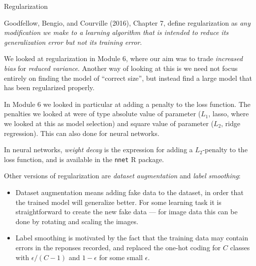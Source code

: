 \documentclass[10pt,ignorenonframetext,]{beamer}
\begin{document}
\begin{frame}[fragile]

\begin{block}{Regularization}

Goodfellow, Bengio, and Courville (2016), Chapter 7, define
regularization as \emph{any modification we make to a learning algorithm
that is intended to reduce its generalization error but not its training
error}.

We looked at regularization in Module 6, where our aim was to trade
\emph{increased bias} for \emph{reduced variance}. Another way of
looking at this is we need not focus entirely on finding the model of
``correct size'', but instead find a large model that has been
regularized properly.

In Module 6 we looked in particular at adding a penalty to the loss
function. The penalties we looked at were of type absolute value of
parameter (\(L_1\), lasso, where we looked at this as model selection)
and square value of parameter (\(L_2\), ridge regression). This can also
done for neural networks.

In neural networks, \emph{weight decay} is the expression for adding a
\(L_2\)-penalty to the loss function, and is available in the
\texttt{nnet} R package.

\end{block}

\end{frame}

\begin{frame}

Other versions of regularization are \emph{dataset augmentation} and
\emph{label smoothing}:

\begin{itemize}
\item
  Dataset augmentation means adding fake data to the dataset, in order
  that the trained model will generalize better. For some learning task
  it is straightforward to create the new fake data --- for image data
  this can be done by rotating and scaling the images.
\item
  Label smoothing is motivated by the fact that the training data may
  contain errors in the reponses recorded, and replaced the one-hot
  coding for \(C\) classes with \(\epsilon/(C-1)\) and \(1-\epsilon\)
  for some small \(\epsilon\).
\end{itemize}

\end{frame}
\end{document}

